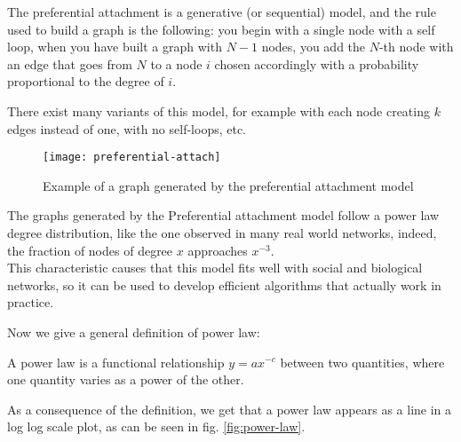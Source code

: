     The preferential attachment is a generative (or sequential) model, and the rule used to build a graph is the following: you begin with a single node with a self loop, when you have built a graph with $N-1$ nodes, you add the $N$-th node with an edge that goes from $N$ to a node $i$ chosen accordingly with a probability proportional to the degree of $i$.
    
    There exist many variants of this model, for example with each node creating $k$ edges instead of one, with no self-loops, etc.

    \begin{figure}[h!]
        \centering
        \texttt{[image: preferential-attach]}
        \caption{Example of a graph generated by the preferential attachment model}
        \label{fig:pref-att}
    \end{figure}

    The graphs generated by the Preferential attachment model follow a power law degree distribution, like the one observed in many real world networks, indeed, the fraction of nodes of degree $x$ approaches $x^{-3}$.\\
    This characteristic causes that this model fits well with social and biological networks, so it can be used to develop efficient algorithms that actually work in practice.
    
    Now we give a general definition of power law:
    \begin{defn}
        A power law is a functional relationship $y = ax^{-c}$ between two quantities, where one quantity varies as a power of the other.
    \end{defn}

    As a consequence of the definition, we get that a power law appears as a line in a log log scale plot, as can be seen in fig. \ref{fig:power-law}.

